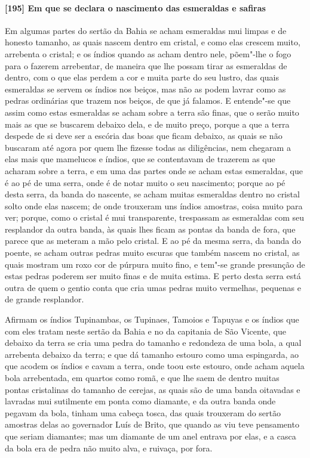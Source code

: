 \begin{linenumbers}
\paragraph{[195] Em que se declara o nascimento das esmeraldas e safiras}\quad
Em algumas partes do sertão da Bahia se acham esmeraldas mui limpas e de honesto tamanho,
as quais nascem dentro em cristal, e como elas crescem muito, arrebenta o cristal; e os
índios quando as acham dentro nele, põem"-lhe o fogo para o fazerem arrebentar, de maneira
que lhe possam tirar as esmeraldas de dentro, com o que elas perdem a cor e muita parte do
seu lustro, das quais esmeraldas se servem os índios nos beiços, mas não as podem lavrar
como as pedras ordinárias que trazem nos beiços, de que já falamos. E entende"-se que assim
como estas esmeraldas se acham sobre a terra são finas, que o serão muito mais as que se
buscarem debaixo dela, e de muito preço, porque a que a terra despede de si deve ser a
escória das boas que ficam debaixo, as quais se não buscaram até agora por quem lhe
fizesse todas as diligências, nem chegaram a elas mais que mamelucos e índios, que se
contentavam de trazerem as que acharam sobre a terra, e em uma das partes onde se acham
estas esmeraldas, que é ao pé de uma serra, onde é de notar muito o seu nascimento; porque
ao pé desta serra, da banda do nascente, se acham muitas esmeraldas dentro no cristal
solto onde elas nascem; de onde trouxeram uns índios amostras, coisa muito para ver;
porque, como o cristal é mui transparente, trespassam as esmeraldas com seu resplandor da
outra banda, às quais lhes ficam as pontas da banda de fora, que parece que as meteram a
mão pelo cristal. E ao pé da mesma serra, da banda do poente, se acham outras pedras muito
escuras que também nascem no cristal, as quais mostram um roxo cor de púrpura muito fino,
e tem"-se grande presunção de estas pedras poderem ser muito finas e de muita estima. E
perto desta serra está outra de quem o gentio conta que cria umas pedras muito vermelhas,
pequenas e de grande resplandor.

Afirmam os índios Tupinambas, os Tupinaes, Tamoios e Tapuyas e os índios que com eles
tratam neste sertão da Bahia e no da capitania de São Vicente, que debaixo da terra se
cria uma pedra do tamanho e redondeza de uma bola, a qual arrebenta debaixo da terra; e
que dá tamanho estouro como uma espingarda, ao que acodem os índios e cavam a terra, onde
toou este estouro, onde acham aquela bola arrebentada, em quartos como romã, e que lhe
saem de dentro muitas pontas cristalinas do tamanho de cerejas, as quais são de uma banda
oitavadas e lavradas mui sutilmente em ponta como diamante, e da outra banda onde pegavam
da bola, tinham uma cabeça tosca, das quais trouxeram do sertão amostras delas ao
governador Luís de Brito, que quando as viu teve pensamento que seriam diamantes; mas um
diamante de um anel entrava por elas, e a casca da bola era de pedra não muito alva, e
ruivaça, por fora.


\end{linenumbers}
